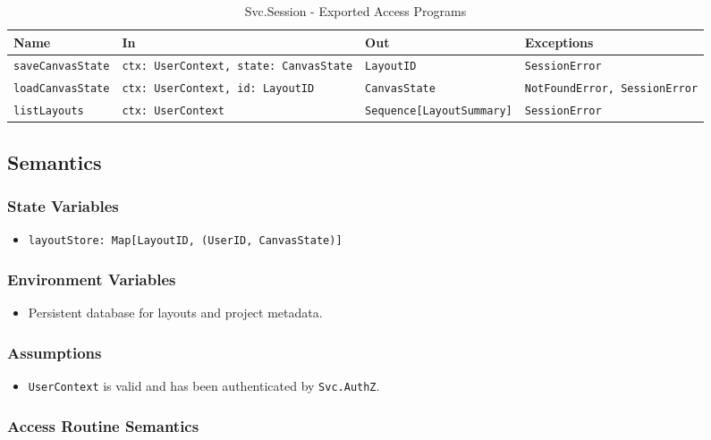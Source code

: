 \documentclass[12pt, titlepage]{article}
\begin{document}
\begin{table}[H]
\centering
\small
\caption{Svc.Session - Exported Access Programs}
\begin{tabular}{p{3.3cm} p{3cm} p{4.8cm} p{3.9cm}}
\toprule
\textbf{Name} & \textbf{In} & \textbf{Out} & \textbf{Exceptions} \\
\midrule
\texttt{saveCanvasState} & \texttt{ctx: UserContext, state: CanvasState} & \texttt{LayoutID} & \texttt{SessionError} \\
\texttt{loadCanvasState} & \texttt{ctx: UserContext, id: LayoutID} & \texttt{CanvasState} & \texttt{NotFoundError, SessionError} \\
\texttt{listLayouts} & \texttt{ctx: UserContext} & \texttt{Sequence[LayoutSummary]} & \texttt{SessionError} \\
\bottomrule
\end{tabular}
\end{table}

\subsection{Semantics}

\subsubsection{State Variables}
\begin{itemize}
    \item \texttt{layoutStore: Map[LayoutID, (UserID, CanvasState)]}
\end{itemize}

\subsubsection{Environment Variables}
\begin{itemize}
    \item Persistent database for layouts and project metadata.
\end{itemize}

\subsubsection{Assumptions}
\begin{itemize}
    \item \texttt{UserContext} is valid and has been authenticated by \texttt{Svc.AuthZ}.
\end{itemize}

\subsubsection{Access Routine Semantics}
\end{document}
